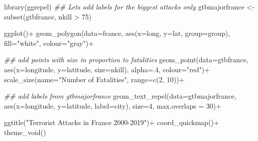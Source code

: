 \documentclass[
  letterpaper,
  DIV=11,
  numbers=noendperiod]{scrreprt}
\newenvironment{Shaded}{\begin{snugshade}}{\end{snugshade}}
\newcommand{\AttributeTok}[1]{\textcolor[rgb]{0.40,0.45,0.13}{#1}}
\newcommand{\DecValTok}[1]{\textcolor[rgb]{0.68,0.00,0.00}{#1}}
\newcommand{\DocumentationTok}[1]{\textcolor[rgb]{0.37,0.37,0.37}{\textit{#1}}}
\newcommand{\FunctionTok}[1]{\textcolor[rgb]{0.28,0.35,0.67}{#1}}
\newcommand{\NormalTok}[1]{\textcolor[rgb]{0.00,0.23,0.31}{#1}}
\newcommand{\OtherTok}[1]{\textcolor[rgb]{0.00,0.23,0.31}{#1}}
\newcommand{\SpecialCharTok}[1]{\textcolor[rgb]{0.37,0.37,0.37}{#1}}
\newcommand{\StringTok}[1]{\textcolor[rgb]{0.13,0.47,0.30}{#1}}
\begin{document}
\begin{Shaded}
\begin{Highlighting}[]
\FunctionTok{library}\NormalTok{(ggrepel)}
\DocumentationTok{\#\# Let\textquotesingle{}s add labels for the biggest attacks only}
\NormalTok{gtbmajorfrance }\OtherTok{\textless{}{-}} \FunctionTok{subset}\NormalTok{(gtbfrance, nkill }\SpecialCharTok{\textgreater{}} \DecValTok{75}\NormalTok{)}


\FunctionTok{ggplot}\NormalTok{()}\SpecialCharTok{+}
  \FunctionTok{geom\_polygon}\NormalTok{(}\AttributeTok{data=}\NormalTok{france, }\FunctionTok{aes}\NormalTok{(}\AttributeTok{x=}\NormalTok{long, }\AttributeTok{y=}\NormalTok{lat, }\AttributeTok{group=}\NormalTok{group), }\AttributeTok{fill=}\StringTok{"white"}\NormalTok{, }\AttributeTok{colour=}\StringTok{"gray"}\NormalTok{)}\SpecialCharTok{+}
  
  
  \DocumentationTok{\#\# add points with size in proportion to fatalities}
  \FunctionTok{geom\_point}\NormalTok{(}\AttributeTok{data=}\NormalTok{gtbfrance, }\FunctionTok{aes}\NormalTok{(}\AttributeTok{x=}\NormalTok{longitude, }\AttributeTok{y=}\NormalTok{latitude, }\AttributeTok{size=}\NormalTok{nkill), }
             \AttributeTok{alpha=}\NormalTok{.}\DecValTok{4}\NormalTok{, }\AttributeTok{colour=}\StringTok{"red"}\NormalTok{)}\SpecialCharTok{+}
  \FunctionTok{scale\_size}\NormalTok{(}\AttributeTok{name=}\StringTok{"Number of Fatalities"}\NormalTok{, }\AttributeTok{range=}\FunctionTok{c}\NormalTok{(}\DecValTok{2}\NormalTok{, }\DecValTok{10}\NormalTok{))}\SpecialCharTok{+}

  \DocumentationTok{\#\# add labels from gtbmajorfrance}
  \FunctionTok{geom\_text\_repel}\NormalTok{(}\AttributeTok{data=}\NormalTok{gtbmajorfrance, }\FunctionTok{aes}\NormalTok{(}\AttributeTok{x=}\NormalTok{longitude, }\AttributeTok{y=}\NormalTok{latitude, }
                                           \AttributeTok{label=}\NormalTok{city), }\AttributeTok{size=}\DecValTok{4}\NormalTok{,}
                  \AttributeTok{max.overlaps =} \DecValTok{30}\NormalTok{)}\SpecialCharTok{+}
  
  
  \FunctionTok{ggtitle}\NormalTok{(}\StringTok{"Terrorist Attacks in France 2000{-}2019"}\NormalTok{)}\SpecialCharTok{+}
  \FunctionTok{coord\_quickmap}\NormalTok{()}\SpecialCharTok{+}
  \FunctionTok{theme\_void}\NormalTok{()}
\end{Highlighting}
\end{Shaded}
\end{document}
